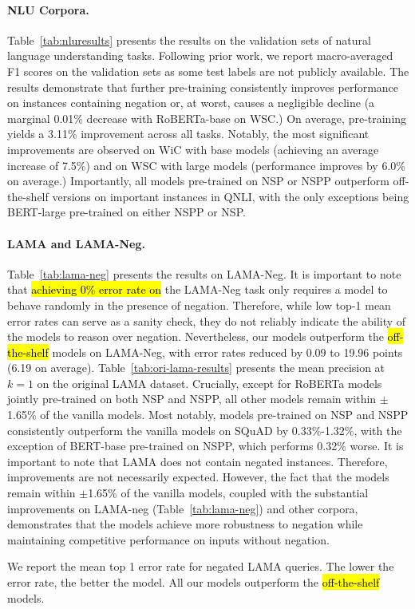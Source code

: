 \paragraph{NLU Corpora.}

Table~\ref{tab:nluresults} presents the results on the validation sets of natural language understanding tasks. 
Following prior work, we report macro-averaged F1 scores on the validation sets as some test labels are not publicly available. 
The results demonstrate that further pre-training consistently improves performance on instances containing negation or, at worst, causes a negligible decline 
(a marginal 0.01\% decrease with {RoBERTa-base} on WSC.)
On average, pre-training yields a 3.11\% improvement across all tasks.
Notably, the most significant improvements are observed on WiC with base models
(achieving an average increase of 7.5\%) and on WSC with large models (performance improves by 6.0\% on average.) 
Importantly, all models pre-trained on NSP or NSPP outperform off-the-shelf versions on important instances in QNLI, 
with the only exceptions being {BERT-large} pre-trained on either NSPP or NSP. 


\paragraph{LAMA and LAMA-Neg.}
Table~\ref{tab:lama-neg} presents the results on LAMA-Neg.
It is important to note that 
\hl{achieving 0\% error rate on}
the LAMA-Neg task only requires a model to behave randomly in the presence of negation. 
Therefore, while low top-1 mean error rates can serve as a sanity check, 
they do not reliably indicate the ability of the models to reason over negation.
Nevertheless, 
our models outperform the \hl{off-the-shelf} models on LAMA-Neg, 
with error rates reduced by 0.09 to 19.96 points (6.19 on average). 
Table~\ref{tab:ori-lama-results} presents the mean precision at $k = 1$ on the original LAMA dataset. 
Crucially, except for {RoBERTa} models jointly pre-trained on both NSP and NSPP, 
all other models remain within $\pm$1.65\% of the vanilla models. 
Most notably, models pre-trained on NSP and NSPP consistently outperform the vanilla models on {SQuAD} by 0.33\%-1.32\%,
with the exception of {BERT-base} pre-trained on NSPP, which performs 0.32\% worse.
It is important to note that LAMA does not contain negated instances.
Therefore, improvements are not necessarily expected. 
However, the fact that the models remain within $\pm$1.65\% of the vanilla models, 
coupled with the substantial improvements on LAMA-neg (Table~\ref{tab:lama-neg}) 
and other corpora, 
demonstrates that the models achieve more robustness to negation while maintaining competitive performance on inputs without negation.
\begin{table}[t]
\centering

\caption{
    We report the mean top 1 error rate for negated LAMA queries. 
    The lower the error rate, the better the model.
    All our models outperform the \hl{off-the-shelf} models.
    \label{tab:lama-neg}
}
\end{table}